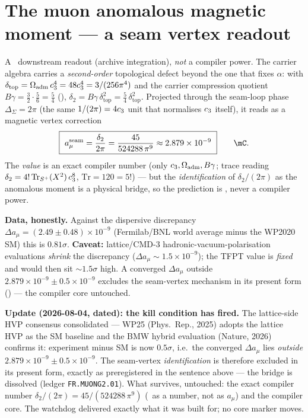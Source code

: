 \section{The muon anomalous magnetic moment --- a seam vertex readout}
A \mC\ downstream readout (archive integration), \emph{not} a compiler power. The carrier algebra
carries a \emph{second-order} topological defect beyond the one that fixes $\alpha$: with
$\delta_{\mathrm{top}}=\Omega_{\mathrm{adm}}\,c_3^4=48c_3^4=3/(256\pi^4)$ and the carrier compression quotient
$B\gamma=\tfrac32\!\cdot\!\tfrac56=\tfrac54$ (),
$\delta_2=B\gamma\,\delta_{\mathrm{top}}^2=\tfrac54\,\delta_{\mathrm{top}}^2$. Projected through the
seam-loop phase $\Delta_\Sigma=2\pi$ (the same $1/(2\pi)=4c_3$ unit that normalises $c_3$ itself),
it reads as a magnetic vertex correction
\[
  \boxed{\ a_\mu^{\mathrm{seam}}=\frac{\delta_2}{2\pi}=\frac{45}{524288\,\pi^9}\approx2.879\times10^{-9}\ }\qquad\mC .
\]
The \emph{value} is an exact compiler number (only $c_3,\Omega_{\mathrm{adm}},B\gamma$; trace reading
$\delta_2=4!\,\mathrm{Tr}_{S^+}(X^2)\,c_3^8$, $\mathrm{Tr}=120=5!$) --- but the \emph{identification} of
$\delta_2/(2\pi)$ as the anomalous moment is a physical bridge, so the prediction is \mC, never a compiler
power. 

\par\smallskip\noindent\textbf{Data, honestly.} Against the dispersive discrepancy
$\Delta a_\mu=(2.49\pm0.48)\times10^{-9}$ (Fermilab/BNL world average minus the WP2020 SM) this is
$0.81\sigma$. \textbf{Caveat:} lattice/CMD-3 hadronic-vacuum-polarisation evaluations \emph{shrink} the
discrepancy ($\Delta a_\mu\sim1.5\times10^{-9}$); the TFPT value is \emph{fixed} and would then sit
${\sim}1.5\sigma$ high. A converged $\Delta a_\mu$ outside $2.879\times10^{-9}\pm0.5\times10^{-9}$ excludes
the seam-vertex mechanism in its present form (\mX) --- the compiler core untouched.
\par\smallskip\noindent\textbf{Update (2026-08-04, dated): the kill condition has fired.} The
lattice-side HVP consensus consolidated --- WP25 (Phys.\ Rep., 2025) adopts the lattice HVP as the SM
baseline and the BMW hybrid evaluation (Nature, 2026) confirms it: experiment minus SM is now
$0.5\sigma$, i.e.\ the converged $\Delta a_\mu$ lies \emph{outside}
$2.879\times10^{-9}\pm0.5\times10^{-9}$. The seam-vertex \emph{identification} is therefore excluded in
its present form, exactly as preregistered in the sentence above --- the bridge is dissolved
(ledger \texttt{FR.MUONG2.01}). What survives, untouched: the exact compiler number
$\delta_2/(2\pi)=45/(524288\,\pi^9)$ (\mE\ as a number, not as $a_\mu$) and the compiler core. The
watchdog delivered exactly what it was built for; no core marker moves.

